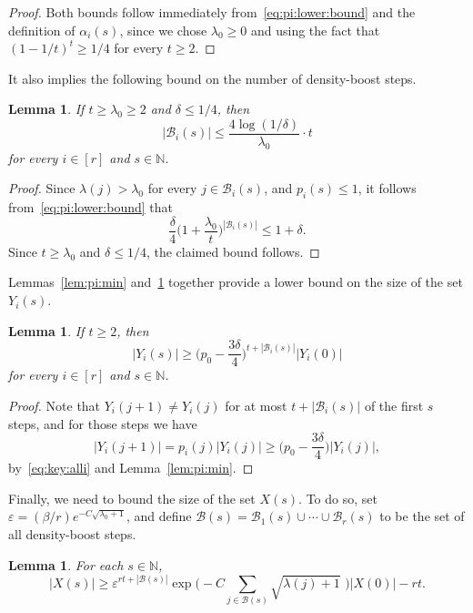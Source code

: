 \documentclass[12pt,reqno]{amsart}
\newtheorem{lemma}[theorem]{Lemma}
\theoremstyle{definition}
\theoremstyle{remark}
\newcommand\N{\mathbb{N}}
\newcommand\cB{\mathcal{B}}
\newcommand\eps{\varepsilon}
\renewcommand{\le}{\leqslant}
\renewcommand{\ge}{\geqslant}
\def\eps{\varepsilon}
\def\N{\mathbb{N}}
\def\cB{\mathcal{B}}
\begin{document}
\begin{proof}
Both bounds follow immediately from~\eqref{eq:pi:lower:bound} and the definition of $\alpha_i(s)$, since we chose $\lambda_0 \ge 0$ and using the fact that $( 1 - 1/t )^t \ge 1/4$ for every $t \ge 2$. 
\end{proof}

It also implies the following bound on the number of density-boost steps. 

\begin{lemma}\label{lem:Bi:max}
If\/ $t \ge \lambda_0 \ge 2$ and\/ $\delta \le 1/4$, then
$$|\cB_i(s)| \le \frac{4 \log(1/\delta)}{\lambda_0} \cdot t$$
for every $i \in [r]$ and $s \in \N$. 
\end{lemma}

\begin{proof}
Since $\lambda(j) > \lambda_0$ for every $j \in \cB_i(s)$, and $p_i(s) \le 1$, it follows from~\eqref{eq:pi:lower:bound} that
$$\frac{\delta}{4} \bigg( 1 + \frac{\lambda_0}{t} \bigg)^{|\cB_i(s)|} \le 1 + \delta.$$
Since $t \ge \lambda_0$ and $\delta \le 1/4$, the claimed bound follows. 
\end{proof}

Lemmas~\ref{lem:pi:min} and~\ref{lem:Bi:max} together provide a lower bound on the size of the set $Y_i(s)$. 

\begin{lemma}\label{lem:Y:lower:bound}
If\/ $t \ge 2$, then
$$|Y_i(s)| \ge \bigg( p_0 - \frac{3\delta}{4} \bigg)^{t + |\cB_i(s)|} |Y_i(0)|$$
for every $i \in [r]$ and $s \in \N$. 
\end{lemma}

\begin{proof}
Note that $Y_i(j+1) \ne Y_i(j)$ for at most $t + |\cB_i(s)|$ of the first $s$ steps, and for those steps we have
$$|Y_i(j+1)| = p_i(j) |Y_i(j)| \ge \bigg( p_0 - \frac{3\delta}{4} \bigg) |Y_i(j)|,$$ 
by~\eqref{eq:key:alli} and Lemma~\ref{lem:pi:min}.
\end{proof}

Finally, we need to bound the size of the set $X(s)$. To do so, set $\eps = (\beta / r) e^{- C \sqrt{\lambda_0 + 1}}$, and define $\cB(s) = \cB_1(s) \cup \cdots \cup \cB_r(s)$ to be the set of all density-boost steps. 

\begin{lemma}\label{lem:X:lower:bound}
For each $s \in \N$, 
\begin{equation}\label{eq:X:lower:bound}
|X(s)| \ge \eps^{rt + |\cB(s)|} \exp\bigg( - C \sum_{j \in \cB(s)} \sqrt{\lambda(j)+1}\,\, \bigg) |X(0)| - rt.
\end{equation}
\end{lemma}
\end{document}
